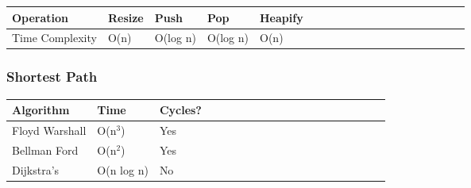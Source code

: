 \documentclass[11pt,oneside]{book}
\begin{document}
\begin{center}\begin{tabulary}{0.4\linewidth}{|l|l|l|l|l|l|l|l|l|l|l|l|l|l|l|l|l|l|l}\hline


  Operation &
  Resize &
  Push &
  Pop &
  Heapify\\
\hline


  Time Complexity &
  O(n) &
  O(log n) &
  O(log n) &
  O(n)\\

\hline\end{tabulary}\end{center}

\subsubsection{Shortest Path}

\begin{center}\begin{tabulary}{0.4\linewidth}{|l|l|l|l|l|l|l|l|l|l|l|l|l|l|l|l|l|l|l}\hline


  Algorithm &
  Time &
  Cycles?\\
\hline


  Floyd Warshall &
  O(n$^{3}$) &
  Yes\\

  Bellman Ford &
  O(n$^{2}$) &
  Yes\\

  Dijkstra's &
  O(n log n) &
  No\\

\hline\end{tabulary}\end{center}

  \newpage\null\thispagestyle{empty}\newpage
\end{document}
